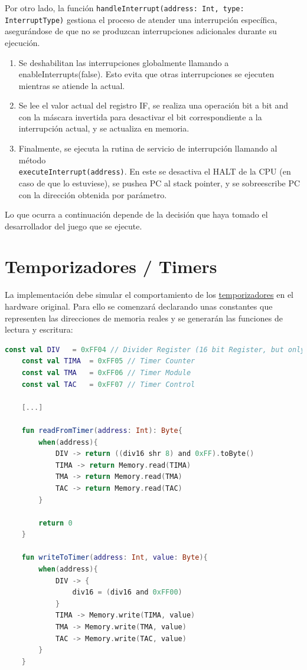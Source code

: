 Por otro lado, la función \texttt{handleInterrupt(address: Int, type: InterruptType)} gestiona el proceso de atender una interrupción específica, asegurándose de que no se produzcan interrupciones adicionales durante su ejecución.

\begin{enumerate}
    \item Se deshabilitan las interrupciones globalmente llamando a enableInterrupts(false). Esto evita que otras interrupciones se ejecuten mientras se atiende la actual.
    \item Se lee el valor actual del registro IF, se realiza una operación bit a bit and con la máscara invertida para desactivar el bit correspondiente a la interrupción actual, y se actualiza en memoria.
    \item Finalmente, se ejecuta la rutina de servicio de interrupción llamando al método \\
    \texttt{executeInterrupt(address)}. En este se desactiva el HALT de la CPU (en caso de que lo estuviese), se pushea PC al stack pointer, y se sobreescribe PC con la dirección obtenida por parámetro. 
\end{enumerate}

Lo que ocurra a continuación depende de la decisión que haya tomado el desarrollador del juego que se ejecute.

\section{Temporizadores / Timers}

La implementación debe simular el comportamiento de los \hyperref[history_timer]{temporizadores} en el hardware original. Para ello se comenzará declarando unas constantes que representen las direcciones de memoria reales y se generarán las funciones de lectura y escritura:\label{writeToTimer}

\begin{lstlisting}[language=Kotlin, caption={Lectura y escritura en registros de Timers.}, label={code:timerwriteread}]
    const val DIV   = 0xFF04 // Divider Register (16 bit Register, but only the upper 8 bit (0-7) are public to the developer)
    const val TIMA  = 0xFF05 // Timer Counter
    const val TMA   = 0xFF06 // Timer Module
    const val TAC   = 0xFF07 // Timer Control

    [...]

    fun readFromTimer(address: Int): Byte{
        when(address){
            DIV -> return ((div16 shr 8) and 0xFF).toByte()
            TIMA -> return Memory.read(TIMA)
            TMA -> return Memory.read(TMA)
            TAC -> return Memory.read(TAC)
        }

        return 0
    }

    fun writeToTimer(address: Int, value: Byte){
        when(address){
            DIV -> {
                div16 = (div16 and 0xFF00)
            }
            TIMA -> Memory.write(TIMA, value)
            TMA -> Memory.write(TMA, value)
            TAC -> Memory.write(TAC, value)
        }
    }
\end{lstlisting}

